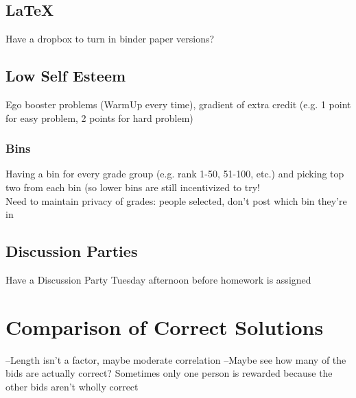\documentclass[leqno]{article}
\begin{document}
\subsection{LaTeX}
Have a dropbox to turn in binder paper versions?

\subsection{Low Self Esteem}
Ego booster problems (WarmUp every time), gradient of extra credit (e.g. 1 point for easy problem, 2 points for hard problem)
\subsubsection{Bins}
Having a bin for every grade group (e.g. rank 1-50, 51-100, etc.) and picking top two from each bin (so lower bins are still incentivized to try!\\

Need to maintain privacy of grades: people selected, don't post which bin they're in\\

\subsection{Discussion Parties}
Have a Discussion Party Tuesday afternoon before homework is assigned

\section{Comparison of Correct Solutions}
--Length isn't a factor, maybe moderate correlation
--Maybe see how many of the bids are actually correct? Sometimes only one person is rewarded because the other bids aren't wholly correct
\end{document}
